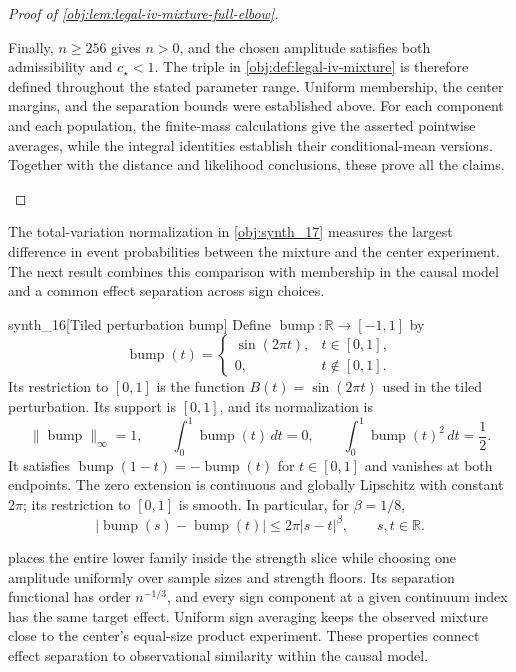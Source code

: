 \documentclass[11pt]{article}
\begin{document}
\begin{proof}[Proof of \cref{obj:lem:legal-iv-mixture-full-elbow}]
\begin{enumerate}
Finally, \(n\ge256\) gives \(n>0\), and the chosen amplitude satisfies both admissibility and \(c_{\star}<1\). The triple in
\cref{obj:def:legal-iv-mixture} is therefore defined throughout the stated parameter range. Uniform membership, the center margins, and the separation bounds were established above. For each component and each population, the finite-mass calculations give the asserted pointwise averages, while the integral identities establish their conditional-mean versions. Together with the distance and likelihood conclusions, these prove all the claims.
\end{enumerate}
\end{proof}

The total-variation normalization in \cref{obj:synth_17} measures the largest difference in event probabilities between the mixture and the center experiment. The next result combines this comparison with membership in the causal model and a common effect separation across sign choices.

\begin{definitionv}{synth_16}[Tiled perturbation bump]
Define \(\operatorname{bump}:\mathbb R\to[-1,1]\) by
\[
\operatorname{bump}(t)=
\begin{cases}
\sin(2\pi t),&t\in[0,1],\\
0,&t\notin[0,1].
\end{cases}
\]
Its restriction to \([0,1]\) is the function \(B(t)=\sin(2\pi t)\) used in the tiled perturbation. Its support is \([0,1]\), and its normalization is
\[
\|\operatorname{bump}\|_\infty=1,\qquad
\int_0^1\operatorname{bump}(t)\,dt=0,\qquad
\int_0^1\operatorname{bump}(t)^2\,dt=\frac12.
\]
It satisfies \(\operatorname{bump}(1-t)=-\operatorname{bump}(t)\) for \(t\in[0,1]\) and vanishes at both endpoints. The zero extension is continuous and globally Lipschitz with constant \(2\pi\); its restriction to \([0,1]\) is smooth. In particular, for \(\beta=1/8\),
\[
|\operatorname{bump}(s)-\operatorname{bump}(t)|
\le 2\pi |s-t|^\beta,\qquad s,t\in\mathbb R.
\]
\end{definitionv}

 places the entire lower family inside the strength slice while choosing one amplitude uniformly over sample sizes and strength floors. Its separation functional  has order \(n^{-1/3}\), and every sign component at a given continuum index has the same target effect. Uniform sign averaging keeps the observed mixture close to the center's equal-size product experiment. These properties connect effect separation to observational similarity within the causal model.
\end{document}
